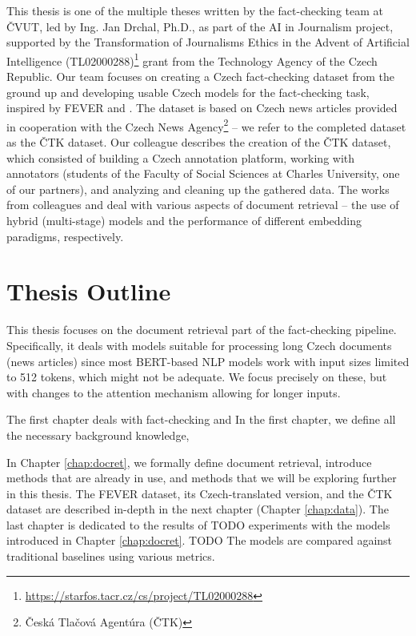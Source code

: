 This thesis is one of the multiple theses written by the fact-checking team at ČVUT, led by Ing. Jan Drchal, Ph.D., as part of the AI in Journalism project, supported by the Transformation of Journalisms Ethics in the Advent of Artificial Intelligence (TL02000288)\footnote{\url{https://starfos.tacr.cz/cs/project/TL02000288}} grant from the Technology Agency of the Czech Republic.
Our team focuses on creating a Czech fact-checking dataset from the ground up and developing usable Czech models for the fact-checking task, inspired by FEVER and \citet{danish_fever}.
The dataset is based on Czech news articles provided in cooperation with the Czech News Agency\footnote{Česká Tlačová Agentúra (ČTK)} -- we refer to the completed dataset as the ČTK dataset. 
Our colleague \citet{ullrich} describes the creation of the ČTK dataset, which consisted of building a Czech annotation platform, working with annotators (students of the Faculty of Social Sciences at Charles University, one of our partners), and analyzing and cleaning up the gathered data.
The works from colleagues \citet{dedkova} and \citet{rypar} deal with various aspects of document retrieval -- the use of hybrid (multi-stage) models and the performance of different embedding paradigms, respectively.

\section*{Thesis Outline}

This thesis focuses on the document retrieval part of the fact-checking pipeline.
Specifically, it deals with models suitable for processing long Czech documents (news articles) since most BERT-based NLP models work with input sizes limited to 512 tokens, which might not be adequate.
We focus precisely on these, but with changes to the attention mechanism allowing for longer inputs.

The first chapter deals with fact-checking and 
In the first chapter, we define all the necessary background knowledge, 

In Chapter \ref{chap:docret}, we formally define document retrieval, introduce methods that are already in use, and methods that we will be exploring further in this thesis. 
The FEVER dataset, its Czech-translated version, and the ČTK dataset are described in-depth in the next chapter (Chapter \ref{chap:data}).
The last chapter is dedicated to the results of TODO experiments with the models introduced in Chapter \ref{chap:docret}.
TODO The models are compared against traditional baselines using various metrics.
